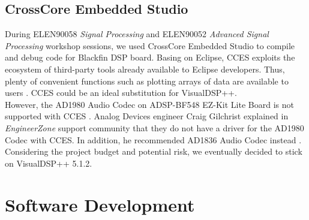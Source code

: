 
\subsection{CrossCore Embedded Studio}

During ELEN90058 \textit{Signal Processing} and ELEN90052 \textit{Advanced Signal Processing} workshop sessions, we used CrossCore\textsuperscript{\textregistered} Embedded Studio to compile and debug code for Blackfin DSP board. Basing on Eclipse, CCES exploits the ecosystem of third-party tools already available to Eclipse developers. Thus, plenty of convenient functions such as plotting arrays of data are available to users \cite{erik-cces}\cite{cces-faq}. CCES could be an ideal substitution for VisualDSP++.\\

However, the AD1980 Audio Codec on ADSP-BF548 EZ-Kit Lite Board is not supported with CCES \cite{cces-ad1980}. Analog Devices engineer Craig Gilchrist explained in \textit{EngineerZone} support community that they do not have a driver for the AD1980 Codec with CCES. In addition, he recommended AD1836 Audio Codec instead \cite{BF548-BSP}.\\

Considering the project budget and potential risk, we eventually decided to stick on VisualDSP++ 5.1.2.


\section{Software Development}

